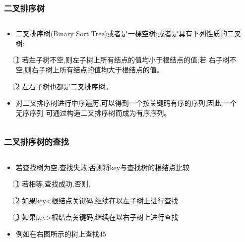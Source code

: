 \begin{frame}[fragile]
  \frametitle{二叉排序树}
  \begin{columns}[T] %
    \begin{column}{0.58\linewidth}
      \begin{itemize}
      \item 二叉排序树(Binary Sort Tree)或者是一棵空树;或者是具有下列性质的二叉树:

        \textcircled{1} 若左子树不空,则左子树上所有结点的值均小于根结点的值;若
        右子树不空,则右子树上所有结点的值均大于根结点的值。

        \textcircled{2} 左右子树也都是二叉排序树。

      \item 对二叉排序树进行中序遍历,可以得到一个按关键码有序的序列,因此,一个无序序列
        可通过构造二叉排序树而成为有序序列。
      \end{itemize}
    \end{column}
    \hfill
    \begin{column}{0.38\linewidth}
    \end{column}
  \end{columns}
\end{frame}

\begin{frame}[fragile]
  \frametitle{二叉排序树的查找}

  \begin{columns}[T] %
    \begin{column}{0.58\linewidth}
      \begin{itemize}
      \item 若查找树为空,查找失败;否则将key与查找树的根结点比较

        \textcircled{1} 若相等,查找成功,否则,

        \textcircled{2} 如果key<根结点关键码,继续在以左子树上进行查找

        \textcircled{3} 如果key>根结点关键码,继续在以右子树上进行查找

      \item 例如在右图所示的树上查找45
      \end{itemize}
    \end{column}
    \hfill
    \begin{column}{0.38\linewidth}
    \end{column}
  \end{columns} 
\end{frame}

